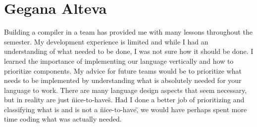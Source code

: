 \documentclass[letterpaper,12pt]{report}
\begin{document}
  \section{Gegana Alteva}
    Building a compiler in a team has provided me with many lessons throughout the semester. My development experience is limited and while I had an understanding of what needed to be done, I was not sure how it should be done. I learned the importance of implementing our language vertically and how to prioritize components. My advice for future teams would be to prioritize what needs to be implemented by understanding what is absolutely needed for your language to work. There are many language design aspects that seem necessary, but in reality are just \"nice-to-have\"s. Had I done a better job of prioritizing and classifying what is and is not a \"nice-to-have\", we would have perhaps spent more time coding what was actually needed.
\end{document}
